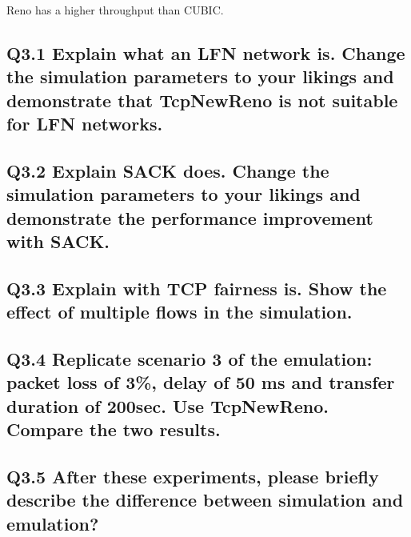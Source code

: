 \documentclass{article}
\begin{document}
Reno has a higher throughput than CUBIC.


\subsection{Q3.1 Explain what an LFN network is. Change the simulation parameters to your likings and demonstrate that TcpNewReno is not suitable for LFN networks.}

\subsection{Q3.2 Explain SACK does. Change the simulation parameters to your likings and demonstrate the performance improvement with SACK.}

\subsection{Q3.3 Explain with TCP fairness is. Show the effect of multiple flows in the simulation.}

\subsection{Q3.4 Replicate scenario 3 of the emulation: packet loss of 3\%, delay of 50 ms and transfer duration of 200sec. Use TcpNewReno. Compare the two results.}

\subsection{Q3.5 After these experiments, please briefly describe the difference between simulation and emulation?}
\end{document}
